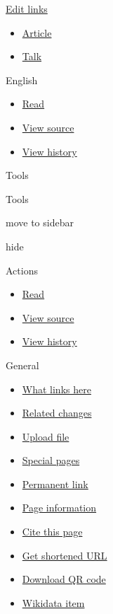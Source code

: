 \documentclass[11pt,a4paper]{article}
\begin{document}
\href{https://www.wikidata.org/wiki/Special:EntityPage/Q3736439\#sitelinks-wikipedia}{Edit links}

\begin{itemize}
\item \href{/wiki/Duck}{Article}
\item \href{/wiki/Talk:Duck}{Talk}
\end{itemize}

English

\begin{itemize}
\item \href{/wiki/Duck}{Read}
\item \href{/w/index.php?title=Duck\&action=edit}{View source}
\item \href{/w/index.php?title=Duck\&action=history}{View history}
\end{itemize}

Tools

Tools

move to sidebar

hide

Actions

\begin{itemize}
\item \href{/wiki/Duck}{Read}
\item \href{/w/index.php?title=Duck\&action=edit}{View source}
\item \href{/w/index.php?title=Duck\&action=history}{View history}
\end{itemize}

General

\begin{itemize}
\item \href{/wiki/Special:WhatLinksHere/Duck}{What links here}
\item \href{/wiki/Special:RecentChangesLinked/Duck}{Related changes}
\item \href{/wiki/Wikipedia:File\_Upload\_Wizard}{Upload file}
\item \href{/wiki/Special:SpecialPages}{Special pages}
\item \href{/w/index.php?title=Duck\&oldid=1246843351}{Permanent link}
\item \href{/w/index.php?title=Duck\&action=info}{Page information}
\item \href{/w/index.php?title=Special:CiteThisPage\&page=Duck\&id=1246843351\&wpFormIdentifier=titleform}{Cite this page}
\item \href{/w/index.php?title=Special:UrlShortener\&url=https\%3A\%2F\%2Fen.wikipedia.org\%2Fwiki\%2FDuck}{Get shortened URL}
\item \href{/w/index.php?title=Special:QrCode\&url=https\%3A\%2F\%2Fen.wikipedia.org\%2Fwiki\%2FDuck}{Download QR code}
\item \href{https://www.wikidata.org/wiki/Special:EntityPage/Q3736439}{Wikidata item}
\end{itemize}
\end{document}

